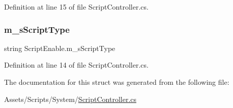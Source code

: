 Definition at line 15 of file Script\+Controller.\+cs.

\mbox{\label{struct_script_enable_a1bfbadb40830b59deac514213d211dd5}} 
\subsubsection{\texorpdfstring{m\+\_\+s\+Script\+Type}{m\_sScriptType}}
{\footnotesize\ttfamily string Script\+Enable.\+m\+\_\+s\+Script\+Type}



Definition at line 14 of file Script\+Controller.\+cs.



The documentation for this struct was generated from the following file\+:\begin{DoxyCompactItemize}
\item 
Assets/\+Scripts/\+System/\mbox{\hyperlink{_script_controller_8cs}{Script\+Controller.\+cs}}\end{DoxyCompactItemize}
